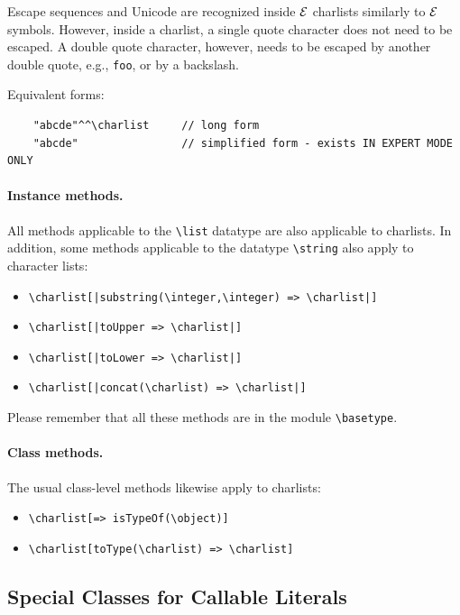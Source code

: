 \documentclass[11pt]{article}
\newcommand{\ERGO}{\mbox{\ensuremath{\cal{E}}\smaller{{\sc{RGO}}}}\xspace}
\newcommand{\FLSYSTEM}{\ERGO}
\newcommand{\bs}{\textbackslash}
\newcommand{\dq}{\symbol{34}}
\begin{document}
Escape sequences and Unicode are recognized inside \FLSYSTEM charlists
similarly to \FLSYSTEM symbols.  However, inside a charlist, a single quote
character does not need to be escaped. A double quote character, however,
needs to be escaped by another double quote, e.g.,
\texttt{{\dq}{\dq}{\dq}foo{\dq}{\dq}{\dq}}, or by a backslash.

\noindent
Equivalent forms:
\begin{verbatim}
    "abcde"^^\charlist     // long form
    "abcde"                // simplified form - exists IN EXPERT MODE ONLY
\end{verbatim}


\paragraph{Instance methods.}
All methods applicable to the \texttt{\bs{}list} datatype
are also applicable to charlists.
In addition, some methods applicable to the datatype \texttt{\bs{}string}
also apply to character lists:
\begin{itemize}
\item {\tt \bs{}charlist[|substring(\bs{}integer,\bs{}integer) => \bs{}charlist|]}  
\item {\tt \bs{}charlist[|toUpper => \bs{}charlist|]}  
\item {\tt \bs{}charlist[|toLower => \bs{}charlist|]}  
\item {\tt \bs{}charlist[|concat(\bs{}charlist) => \bs{}charlist|]}  
\end{itemize}

\noindent
Please remember that all these methods are in the module
\texttt{\bs{}basetype}. 

\paragraph{Class methods.}
The usual class-level methods likewise apply to charlists:
\begin{itemize}
\item {\tt \bs{}charlist[=> isTypeOf(\bs{}object)]}  
\item {\tt \bs{}charlist[toType(\bs{}charlist) => \bs{}charlist]}  
\end{itemize}

\subsection{Special Classes for Callable Literals}\label{sec-callable}
\end{document}
